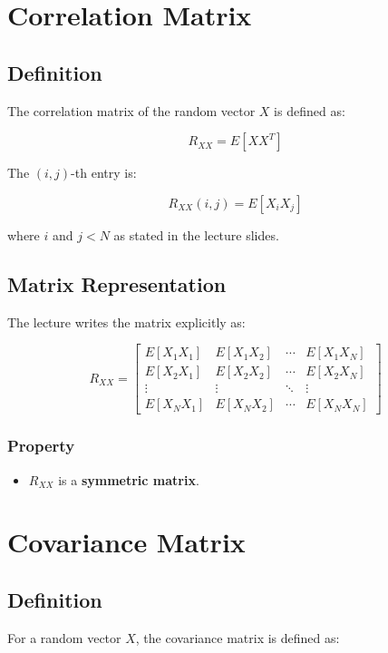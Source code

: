 \documentclass[12pt]{article}
\begin{document}
\section{Correlation Matrix}

\subsection{Definition}

The correlation matrix of the random vector \(X\) is defined as:

\[
R_{XX} = E[XX^T]
\]

The \((i,j)\)-th entry is:

\[
R_{XX}(i,j) = E[X_i X_j]
\]

where \(i\) and \(j < N\) as stated in the lecture slides.

\subsection{Matrix Representation}

The lecture writes the matrix explicitly as:

\[
R_{XX} =
\begin{bmatrix}
E[X_1X_1] & E[X_1X_2] & \cdots & E[X_1X_N] \\
E[X_2X_1] & E[X_2X_2] & \cdots & E[X_2X_N] \\
\vdots & \vdots & \ddots & \vdots \\
E[X_NX_1] & E[X_NX_2] & \cdots & E[X_NX_N]
\end{bmatrix}
\]

\subsubsection*{Property}

\begin{itemize}
    \item \(R_{XX}\) is a \textbf{symmetric matrix}.
\end{itemize}

\section{Covariance Matrix}

\subsection{Definition}

For a random vector \(X\), the covariance matrix is defined as:
\end{document}
